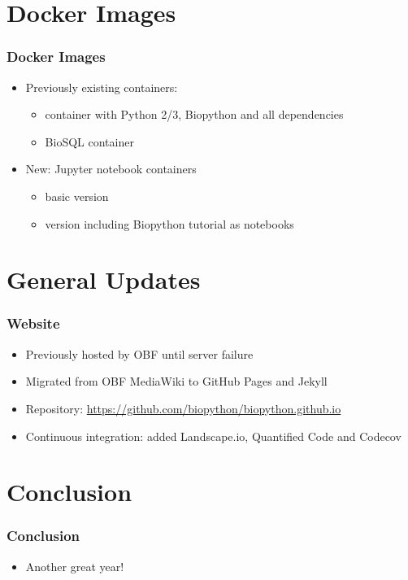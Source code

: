 \documentclass[trans]{beamer}
\begin{document}

\section{Docker Images}
\frame
{
  \frametitle{Docker Images}

  \begin{itemize}
  \item Previously existing containers:
    \begin{itemize}
    \item container with Python 2/3, Biopython and all dependencies
    \item BioSQL container
  \end{itemize}
  \item New: Jupyter notebook containers
    \begin{itemize}
      \item basic version
      \item version including Biopython tutorial as notebooks
    \end{itemize}
  \end{itemize}
}


\section{General Updates}
\frame
{
  \frametitle{Website}

  \begin{itemize}
  \item Previously hosted by OBF until server failure
  \item Migrated from OBF MediaWiki to GitHub Pages and Jekyll
  \item Repository: \url{https://github.com/biopython/biopython.github.io}
  \item Continuous integration: added Landscape.io, Quantified Code and Codecov
  \end{itemize}
}


\section{Conclusion}
\frame
{
  \frametitle{Conclusion}

  \begin{itemize}
  \item Another great year!
  \end{itemize}
}
\end{document}
